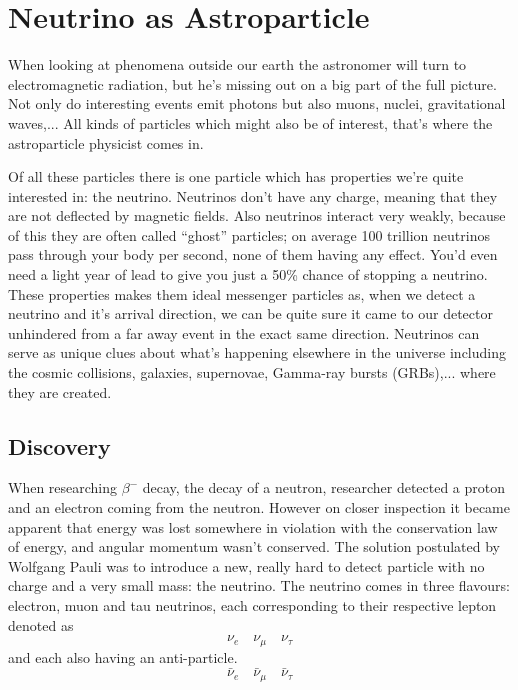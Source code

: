 \documentclass[11pt,a4paper,faculty=we,language=en,doctype=report]{cls/ugent-doc}
\begin{document}
\chapter{Neutrino as Astroparticle}
When looking at phenomena outside our earth the astronomer will turn to
electromagnetic radiation, but he's missing out on a big part of the full
picture. Not only do interesting events emit photons but also muons, nuclei,
gravitational waves,... All kinds of particles which might also be of interest,
that's where the astroparticle physicist comes in.

Of all these particles there is one particle which has properties we're quite
interested in: the neutrino.  Neutrinos don't have any charge, meaning that
they are not deflected by magnetic fields. Also neutrinos interact very weakly,
because of this they are often called “ghost” particles; on average 100
trillion neutrinos pass through your body per second, none of them having any
effect.  You'd even need a light year of lead to give you just a 50\% chance of
stopping a neutrino.
These properties makes them ideal messenger particles as, when we detect a neutrino
and it's arrival direction, we can be quite sure it came to our detector unhindered
from a far away event in the exact same direction.
Neutrinos can serve as unique clues
about what’s happening elsewhere in the universe including the cosmic
collisions, galaxies, supernovae, Gamma-ray bursts (GRBs),... where they are created.

\section{Discovery}
When researching $\beta^-$ decay, the decay of a neutron, researcher
detected a proton and an electron coming from the neutron. However
on closer inspection it became apparent that energy was lost
somewhere in violation with the conservation law of energy, and
angular momentum wasn't conserved.  The solution postulated by
Wolfgang Pauli was to introduce a new, really hard to detect
particle with no charge and a very small mass: the neutrino.  The neutrino comes in three flavours:
electron, muon and tau neutrinos, each corresponding to their respective lepton denoted as
\begin{equation}
	\nu_e \quad \nu_\mu \quad \nu_\tau
\end{equation}
and each also having an anti-particle.
\begin{equation}
	\bar{\nu}_e \quad \bar{\nu}_\mu \quad \bar{\nu}_\tau
\end{equation}
\end{document}
